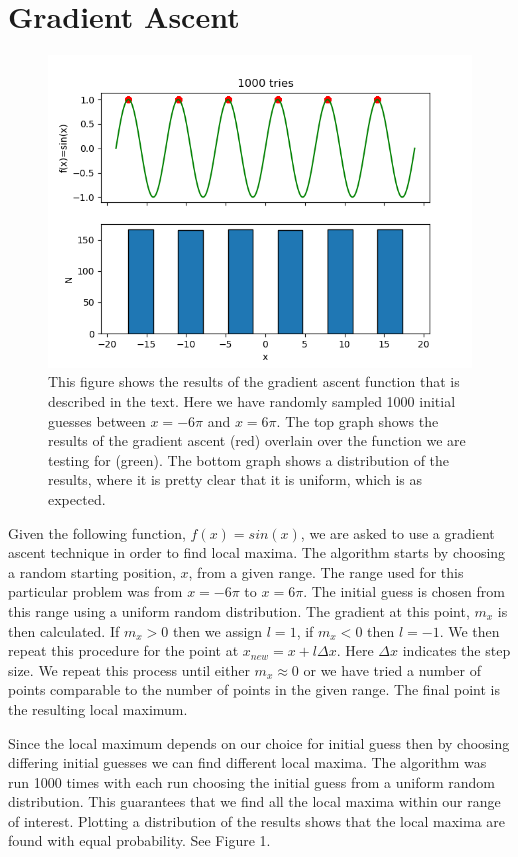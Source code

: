 \documentclass{article}
\begin{document}
\section{Gradient Ascent}
\begin{figure}[h]
\centering
\includegraphics[width=0.9\linewidth]{Q1.png}
\caption{This figure shows the results of the gradient ascent function that is described in the text. Here we have randomly sampled 1000 initial guesses between $x=-6\pi$ and $x=6\pi$. The top graph shows the results of the gradient ascent (red) overlain over the function we are testing for (green). The bottom graph shows a distribution of the results, where it is pretty clear that it is uniform, which is as expected.}
\end{figure}

Given the following function, $f(x) = sin(x)$, we are asked to use a gradient ascent technique in order to find local maxima. The algorithm starts by choosing a random starting position, $x$, from a given range. The range used for this particular problem was from $x=-6\pi$ to $x=6\pi$. The initial guess is chosen from this range using a uniform random distribution. The gradient at this point, $m_x$ is then calculated. If $m_x >0$ then we assign $l=1$, if $m_x<0$ then $l=-1$. We then repeat this procedure for the point at $x_{new} = x+l\Delta x$. Here $\Delta x$ indicates the step size. We repeat this process until either $m_x\approx0$ or we have tried a number of points comparable to the number of points in the given range. The final point is the resulting local maximum.

Since the local maximum depends on our choice for initial guess then by choosing differing initial guesses we can find different local maxima. The algorithm was run 1000 times with each run choosing the initial guess from a uniform random distribution. This guarantees that we find all the local maxima within our range of interest. Plotting a distribution of the results shows that the local maxima are found with equal probability. See Figure 1.
\end{document}
